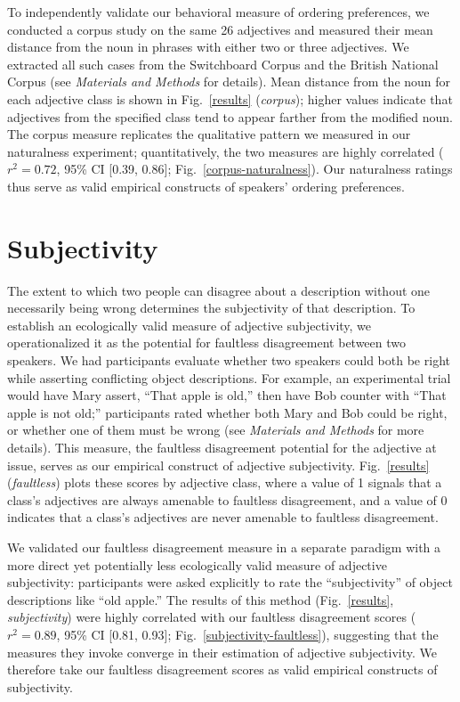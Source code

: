 \documentclass{pnastwo}
\begin{document}
\begin{article}
To independently validate our behavioral measure of ordering preferences, we conducted a corpus study on the same 26 adjectives and measured their mean distance from the noun in phrases with either two or three adjectives. We extracted all such cases from the Switchboard Corpus and the British National Corpus (see \emph{Materials and Methods} for details). Mean distance from the noun for each adjective class is shown in Fig.~\ref{results} (\emph{corpus}); higher values indicate that adjectives from the specified class tend to appear farther from the modified noun. The corpus measure replicates the qualitative pattern we measured in our naturalness experiment; quantitatively, the two measures are highly correlated ($r^{2}=0.72$, 95\% CI [0.39, 0.86]; Fig.~\ref{corpus-naturalness}). Our naturalness ratings thus serve as valid empirical constructs of speakers' ordering preferences.

\section{Subjectivity}

The extent to which two people can disagree about a description without one necessarily being wrong determines the subjectivity of that description. To  establish an ecologically valid measure of adjective subjectivity, we operationalized it as the potential for faultless disagreement between two speakers. We had participants evaluate whether two speakers could both be right while asserting conflicting object descriptions. For example, an experimental trial would have Mary assert, ``That apple is old,'' then have Bob counter with ``That apple is not old;'' 
participants rated whether both Mary and Bob could be right, or whether one of them must be wrong (see \emph{Materials and Methods} for more details). This measure, the faultless disagreement potential for the adjective at issue, serves as our empirical construct of adjective subjectivity. Fig.\ \ref{results} (\emph{faultless}) plots these scores by adjective class, where a value of 1 signals that a class's adjectives are always amenable to faultless disagreement, and a value of 0 indicates that a class's adjectives are never amenable to faultless disagreement.

We validated our faultless disagreement measure in a separate paradigm with a more direct yet potentially less ecologically valid measure of adjective subjectivity: participants were asked explicitly to rate the ``subjectivity'' of object descriptions like ``old apple.'' The results of this method (Fig.~\ref{results}, \emph{subjectivity}) were highly correlated with our faultless disagreement scores ($r^{2} = 0.89$, 95\% CI [0.81, 0.93]; Fig.~\ref{subjectivity-faultless}), suggesting that the measures they invoke converge in their estimation of adjective subjectivity. We therefore take our faultless disagreement scores as valid empirical constructs of subjectivity.


\end{article}
\end{document}
